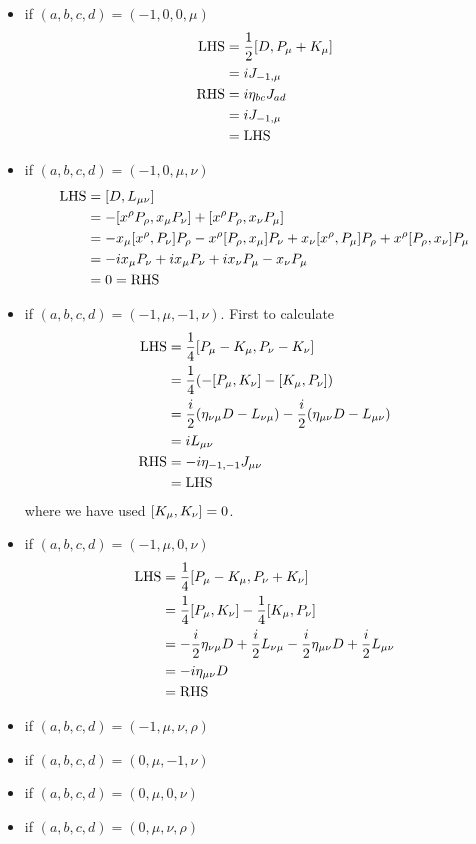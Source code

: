 \begin{enumerate}
\begin{itemize}
			\item if $(a,b,c,d) = (-1,0,0,\mu)$
				\begin{align*}
					\text{LHS} &= \frac{1}{2} \comm{D}{P_\mu + K_\mu} \\
								  &= i J_{-1,\mu} \\
					\text{RHS} &= i \eta_{bc}J_{ad} \\
								  &= iJ_{-1,\mu} \\
								  &= \text{LHS}
				\end{align*}
			\item if $(a,b,c,d) = (-1,0,\mu,\nu)$
				\begin{align*}
					\text{LHS} &= \comm{D}{L_{\mu\nu}} \\
								  &= -\comm{x^\rho P_\rho}{x_\mu P_\nu} + \comm{x^\rho P_\rho}{x_\nu P_\mu} \\
								  &= -x_\mu \comm{x^\rho}{P_\nu} P_\rho - x^\rho \comm{P_\rho}{x_\mu} P_\nu + x_\nu \comm{x^\rho}{P_\mu} P_\rho + x^\rho \comm{P_\rho}{x_\nu} P_\mu \\
								  &= -i x_\mu P_\nu +i x_\mu P_\nu + i x_\nu P_\mu - x_\nu P_\mu \\
								  &= 0 = \text{RHS}
				\end{align*}
			\item if $(a,b,c,d) = (-1,\mu,-1,\nu)$.
				First to calculate
				\begin{align*}
					\text{LHS} &= \frac{1}{4} \comm{P_\mu - K_\mu}{P_\nu - K_\nu} \\
								  &= \frac{1}{4} (-\comm{P_\mu}{K_\nu} - \comm{K_\mu}{P_\nu} ) \\
								  &= \frac{i}{2}(\eta_{\nu\mu}D - L_{\nu\mu}) - \frac{i}{2} (\eta_{\mu\nu} D - L_{\mu\nu}) \\
								  &= i L_{\mu\nu} \\
					\text{RHS} &= -i \eta_{-1,-1} J_{\mu\nu} \\
								  &= \text{LHS}
				\end{align*}
				where we have used $\comm{K_\mu}{K_\nu}=0$.
			\item if $(a,b,c,d) = (-1,\mu,0,\nu)$
				\begin{align*}
					\text{LHS} &= \frac{1}{4} \comm{P_\mu - K_\mu}{P_\nu + K_\nu} \\
								  &= \frac{1}{4} \comm{P_\mu}{K_\nu} - \frac{1}{4} \comm{K_\mu}{P_\nu} \\
								  &= -\frac{i}{2} \eta_{\nu\mu} D + \frac{i}{2} L_{\nu\mu} - \frac{i}{2} \eta_{\mu\nu} D + \frac{i}{2} L_{\mu\nu} \\
								  &= - i \eta_{\mu\nu} D  \\
								  &= \text{RHS}
				\end{align*}
			\item if $(a,b,c,d) = (-1,\mu,\nu,\rho)$
			\item if $(a,b,c,d) = (0,\mu,-1,\nu)$
			\item if $(a,b,c,d) = (0,\mu,0,\nu)$
			\item if $(a,b,c,d) = (0,\mu,\nu,\rho)$
		\end{itemize}
\end{enumerate}
